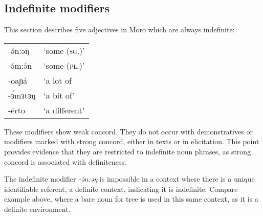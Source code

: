 %
%
%

\subsection{Indefinite modifiers}\label{sec:ch8:indefinite}

This section describes five adjectives in Moro which are always indefinite:
\ea 
 \begin{tabular}[t]{ll}
{-ə́n:əŋ}& `some (\textsc{sg}.)'\\
{-ə́m:ə́n} &  `some (\textsc{pl}.)' \\
{-oaɲá} & `a lot of \\ 
{-ɜ́mɜtɜŋ} &  `a bit of' \\
{-érto} & `a different' \end{tabular}
\z  
These modifiers show weak concord. They do not occur with demonstratives or modifiers marked with strong concord, either in texts or in elicitation. This point provides evidence that they are restricted to indefinite noun phrases, as strong concord is associated with definiteness. %

The indefinite modifier \textit{-ə́n:əŋ} is impossible in a context where there is a unique identifiable referent, a definite context, indicating it is indefinite.
\z 
Compare example  above, where a bare noun for tree is used in this same context, as it is a definite environment. 

